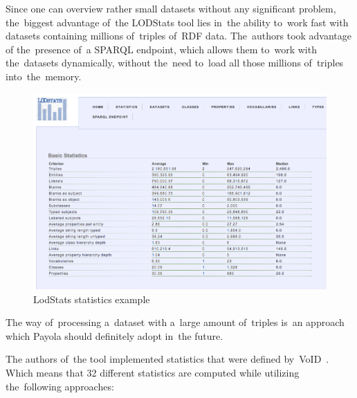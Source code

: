 Since one can overview rather small datasets without any significant problem, 
the~biggest advantage of~the LODStats tool lies in~the ability to~work fast with 
datasets containing millions of~triples of~RDF data. The~authors took advantage 
of the~presence of~a SPARQL endpoint, which allows them to~work with the~datasets 
dynamically, without the~need to~load all those millions of~triples into~the~memory.


\begin{figure}
	\centering
	\includegraphics[width=140mm]{img/lodstats.png}
	\caption{LodStats statistics example}
	\label{fig:lodstats}
\end{figure}

The way of~processing a~dataset with a~large amount of~triples is~an approach 
which Payola should definitely adopt in~the future.

The authors of~the tool implemented statistics that were defined by~VoID~\cite{void}. Which 
means that 32 different statistics are computed while utilizing the~following 
approaches:

